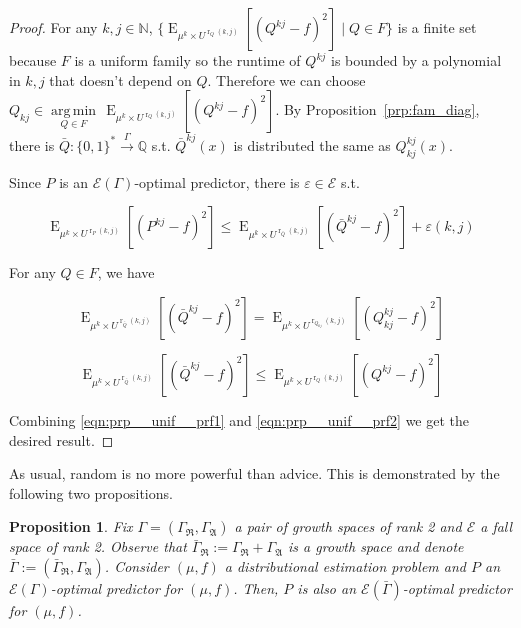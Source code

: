 \documentclass{article}
\theoremstyle{definition}
\theoremstyle{plain}
\newtheorem{proposition}{Proposition}[section]
\newcommand{\Words}{{\{ 0, 1 \}^*}}
\DeclareMathOperator{\E}{E}
\DeclareMathOperator{\R}{r}
\newcommand{\Argmin}[1]{\underset{#1}{\operatorname{arg\,min}}\,}
\newcommand{\Nats}{\mathbb{N}}
\newcommand{\Rats}{\mathbb{Q}}
\begin{document}
\begin{proof}

For any $k,j \in \Nats$, $\{\E_{\mu^k \times U^{\R_Q(k,j)}}[(Q^{kj} - f)^2] \mid Q \in F\}$ is a finite set because $F$ is a uniform family so the runtime of $Q^{kj}$ is bounded by a polynomial in $k,j$ that doesn't depend on $Q$. Therefore we can choose ${Q_{kj} \in \Argmin{Q \in F} \E_{\mu^k \times U^{\R_Q(k,j)}}[(Q^{kj} - f)^2]}$. By Proposition~\ref{prp:fam_diag}, there is $\bar{Q}: \Words \xrightarrow{\Gamma} \Rats$ s.t. $\bar{Q}^{kj}(x)$ is distributed the same as $Q_{kj}^{kj}(x)$.

Since $P$ is an $\mathcal{E}(\Gamma)$-optimal predictor, there is $\varepsilon \in \mathcal{E}$ s.t.

\begin{equation}
\label{eqn:prp__unif__prf1}
\E_{\mu^k \times U^{\R_P(k,j)}}[(P^{kj} - f)^2] \leq \E_{\mu^k \times U^{\R_{\bar{Q}}(k,j)}}[(\bar{Q}^{kj} - f)^2] + \varepsilon(k,j)
\end{equation}

For any $Q \in F$, we have 

$$\E_{\mu^k \times U^{\R_{\bar{Q}}(k,j)}}[(\bar{Q}^{kj} - f)^2]=\E_{\mu^k \times U^{\R_{Q_{kj}}(k,j)}}[(Q_{kj}^{kj} - f)^2]$$

\begin{equation}
\label{eqn:prp__unif__prf2}
\E_{\mu^k \times U^{\R_{\bar{Q}}(k,j)}}[(\bar{Q}^{kj} - f)^2] \leq \E_{\mu^k \times U^{\R_Q(k,j)}}[(Q^{kj} - f)^2]
\end{equation}

Combining \ref{eqn:prp__unif__prf1} and \ref{eqn:prp__unif__prf2} we get the desired result.

\end{proof}

As usual, random is no more powerful than advice. This is demonstrated by the following two propositions.

\begin{proposition}

Fix $\Gamma=(\Gamma_{\mathfrak{R}},\Gamma_{\mathfrak{A}})$ a pair of growth spaces of rank 2 and $\mathcal{E}$ a fall space of rank 2. Observe that $\bar{\Gamma}_{\mathfrak{R}}:=\Gamma_{\mathfrak{R}}+\Gamma_{\mathfrak{A}}$ is a growth space and denote $\bar{\Gamma}:=(\bar{\Gamma}_{\mathfrak{R}},\Gamma_{\mathfrak{A}})$. Consider $(\mu,f)$ a distributional estimation problem and $P$ an $\mathcal{E}(\Gamma)$-optimal predictor for $(\mu,f)$. Then, $P$ is also an $\mathcal{E}(\bar{\Gamma})$-optimal predictor for $(\mu,f)$.

\end{proposition}
\end{document}
